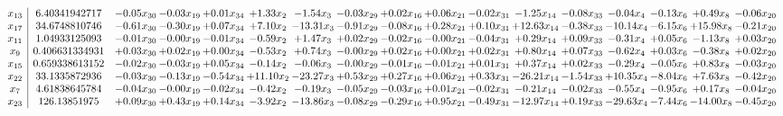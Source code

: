 \documentclass[9pt]{article}
\begin{document}
 \[\begin{array}{c| c c@{\hskip 2pt} c@{\hskip 2pt} c@{\hskip 2pt} c@{\hskip 2pt} c@{\hskip 2pt} c@{\hskip 2pt} c@{\hskip 2pt} c@{\hskip 2pt} c@{\hskip 2pt} c@{\hskip 2pt} c@{\hskip 2pt} c@{\hskip 2pt} c@{\hskip 2pt} c@{\hskip 2pt} c@{\hskip 2pt} }
 x_{13}   &  6.40341942717 & -0.05 x_{30} & -0.03 x_{19} & +  0.01 x_{34} & +  1.33 x_{2} & -1.54 x_{3} & -0.03 x_{29} & +  0.02 x_{16} & +  0.06 x_{21} & -0.02 x_{31} & -1.25 x_{14} & -0.08 x_{33} & -0.04 x_{4} & -0.13 x_{6} & +  0.49 x_{8} & -0.06 x_{20}\\
 x_{17}   &  34.6748810746 & -0.61 x_{30} & -0.30 x_{19} & +  0.07 x_{34} & +  7.10 x_{2} & -13.31 x_{3} & -0.91 x_{29} & -0.08 x_{16} & +  0.28 x_{21} & +  0.10 x_{31} & + 12.63 x_{14} & -0.38 x_{33} & -10.14 x_{4} & -6.15 x_{6} & + 15.98 x_{8} & -0.21 x_{20}\\
 x_{11}   &  1.04933125093 & -0.01 x_{30} & -0.00 x_{19} & -0.01 x_{34} & -0.59 x_{2} & +  1.47 x_{3} & +  0.02 x_{29} & -0.02 x_{16} & -0.00 x_{21} & -0.04 x_{31} & +  0.29 x_{14} & +  0.09 x_{33} & -0.31 x_{4} & +  0.05 x_{6} & -1.13 x_{8} & +  0.03 x_{20}\\
 x_{9}   &  0.406631334931 & +  0.03 x_{30} & +  0.02 x_{19} & +  0.00 x_{34} & -0.53 x_{2} & +  0.74 x_{3} & -0.00 x_{29} & +  0.02 x_{16} & +  0.00 x_{21} & +  0.02 x_{31} & +  0.80 x_{14} & +  0.07 x_{33} & -0.62 x_{4} & +  0.03 x_{6} & -0.38 x_{8} & +  0.02 x_{20}\\
 x_{15}   &  0.659338613152 & -0.02 x_{30} & -0.03 x_{19} & +  0.05 x_{34} & -0.14 x_{2} & -0.06 x_{3} & -0.00 x_{29} & -0.01 x_{16} & -0.01 x_{21} & +  0.01 x_{31} & +  0.37 x_{14} & +  0.02 x_{33} & -0.29 x_{4} & -0.05 x_{6} & +  0.83 x_{8} & -0.03 x_{20}\\
 x_{22}   &  33.1335872936 & -0.03 x_{30} & -0.13 x_{19} & -0.54 x_{34} & + 11.10 x_{2} & -23.27 x_{3} & +  0.53 x_{29} & +  0.27 x_{16} & +  0.06 x_{21} & +  0.33 x_{31} & -26.21 x_{14} & -1.54 x_{33} & + 10.35 x_{4} & -8.04 x_{6} & +  7.63 x_{8} & -0.42 x_{20}\\
 x_{7}   &  4.61838645784 & -0.04 x_{30} & -0.00 x_{19} & -0.02 x_{34} & -0.42 x_{2} & -0.19 x_{3} & -0.05 x_{29} & -0.03 x_{16} & +  0.01 x_{21} & -0.02 x_{31} & -0.21 x_{14} & -0.02 x_{33} & -0.55 x_{4} & -0.95 x_{6} & +  0.17 x_{8} & -0.04 x_{20}\\
 x_{23}   &  126.13851975 & +  0.09 x_{30} & +  0.43 x_{19} & +  0.14 x_{34} & -3.92 x_{2} & -13.86 x_{3} & -0.08 x_{29} & -0.29 x_{16} & +  0.95 x_{21} & -0.49 x_{31} & -12.97 x_{14} & +  0.19 x_{33} & -29.63 x_{4} & -7.44 x_{6} & -14.00 x_{8} & -0.45 x_{20}\\

\end{array}\]
\end{document}
